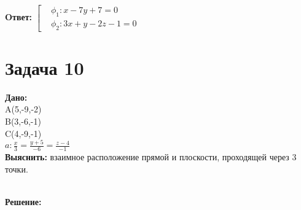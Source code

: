 \documentclass{article}
\begin{document}
\textbf{Oтвет: }\begin{math} 
 \left[
        \begin{aligned}
         &\phi_1: x-7y+7 = 0\\ 
         &\phi_2: 3x+y-2z - 1 = 0 
        \end{aligned}
      \right. 
\end{math}
 
\section*{Задача 10}

\begin{minipage}[t]{0.45\textwidth}

\textbf{Дано:}\\ 
A(5,-9,-2)\\ 
B(3,-6,-1)\\ 
C(4,-9,-1)\\ 
$a: \frac{x}{3} = \frac{y+5}{-6} = \frac{z-4}{-1} $\\ 
\textbf{Выяснить: }взаимное расположение прямой и плоскости, 
проходящей через 3 точки. 
\end{minipage}
\begin{minipage}[t]{0.45\textwidth}
  \vspace{-\baselineskip} %

\begin{center}
\end{center}
\end{minipage}
\\
\textbf{Решение:}
\end{document}
